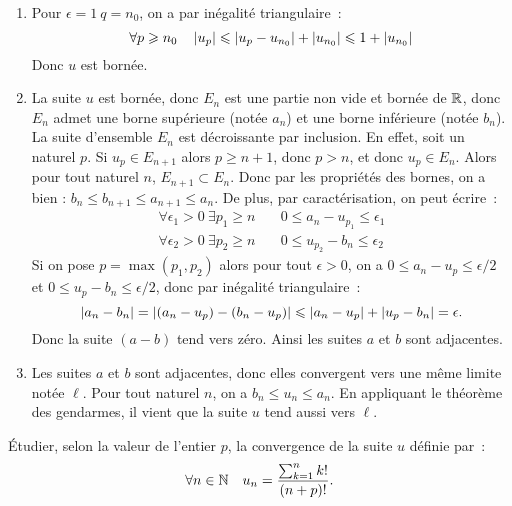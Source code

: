 \begin{enumerate}
    \item Pour \(\epsilon = 1 \ q = n_0\), on a par inégalité triangulaire~:
        \[ \forall p \geqslant n_0 \quad \left\lvert u_p\right\rvert \leqslant \left\lvert u_p - u_{n_0}\right\rvert + \left\lvert u_{n_0}\right\rvert \leqslant 1 + \left\lvert u_{n_0}\right\rvert\]
        Donc \(u\) est bornée.
    \item La suite \(u\) est bornée, donc \(E_n\) est une partie non vide et bornée de \(\mathbb{R}\), donc \(E_n\) admet une borne supérieure (notée \(a_n\)) et une borne inférieure (notée \(b_n\)). La suite d'ensemble \(E_n\) est décroissante par inclusion. En effet, soit un naturel \(p\). Si \(u_p \in E_{n+1}\) alors \(p \geqslant n+1\), donc \(p > n\), et donc \(u_p \in E_n\). Alors pour tout naturel \(n\), \(E_{n+1} \subset E_n\). Donc par les propriétés des bornes, on a bien : \(b_n \leqslant b_{n+1} \leqslant a_{n+1} \leqslant a_n\). De plus, par caractérisation, on peut écrire~:
        \begin{align*}
            \forall \epsilon_1 >0 \ \exists p_1 \geqslant n & \quad 0 \leqslant a_n - u_{p_1} \leqslant \epsilon_1 \\
            \forall \epsilon_2 >0 \ \exists p_2 \geqslant n & \quad 0 \leqslant u_{p_2} - b_n \leqslant \epsilon_2
        \end{align*}
Si on pose \(p = \max(p_1,p_2)\) alors pour tout \(\epsilon>0\), on a \(0 \leqslant a_n-u_p \leqslant \epsilon/2\) et \(0 \leqslant u_p-b_n \leqslant \epsilon/2\), donc par inégalité triangulaire~:
\[ \left\lvert a_n - b_n\right\rvert = \left\lvert(a_n-u_p) - (b_n-u_p)\right\rvert \leqslant \left\lvert a_n-u_p\right\rvert + \left\lvert u_p-b_n\right\rvert = \epsilon. \]
Donc la suite \((a-b)\) tend vers zéro. Ainsi les suites \(a\) et \(b\) sont adjacentes.
\item Les suites \(a\) et \(b\) sont adjacentes, donc elles convergent vers une même limite notée \(\ell\). Pour tout naturel \(n\), on a \(b_n \leqslant u_n \leqslant a_n\). En appliquant le théorème des gendarmes, il vient que la suite \(u\) tend aussi vers \(\ell\).
\end{enumerate}
\begin{exercice}
    Étudier, selon la valeur de l'entier \(p\), la convergence de la suite \(u\) définie par~: \[\forall n \in \mathbb{N} \quad u_n = \frac{\sum_{k=1}^n k!}{(n+p)!}.\]
\end{exercice}

